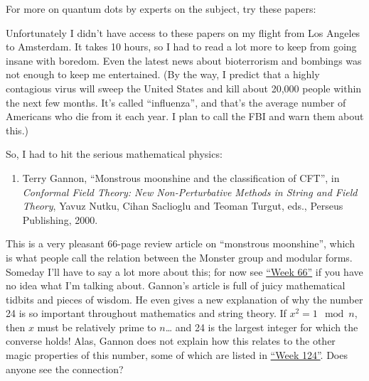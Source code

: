 \documentclass{article}
\def\tightlist{}
\renewcommand{\texttt}[1]{%
  \begingroup
  \ttfamily
  \begingroup\lccode`~=`/\lowercase{\endgroup\def~}{/\discretionary{}{}{}}%
  \begingroup\lccode`~=`[\lowercase{\endgroup\def~}{[\discretionary{}{}{}}%
  \begingroup\lccode`~=`.\lowercase{\endgroup\def~}{.\discretionary{}{}{}}%
  \catcode`/=\active\catcode`[=\active\catcode`.=\active
  \scantokens{#1\noexpand}%
  \endgroup
}
\begin{document}
For more on quantum dots by experts on the subject, try these papers:


Unfortunately I didn't have access to these papers on my flight from Los
Angeles to Amsterdam. It takes 10 hours, so I had to read a lot more to
keep from going insane with boredom. Even the latest news about
bioterrorism and bombings was not enough to keep me entertained. (By the
way, I predict that a highly contagious virus will sweep the United
States and kill about 20,000 people within the next few months. It's
called ``influenza'', and that's the average number of Americans who die
from it each year. I plan to call the FBI and warn them about this.)

So, I had to hit the serious mathematical physics:

\begin{enumerate}
\def\labelenumi{\arabic{enumi})}
\setcounter{enumi}{4}
\tightlist
\item
  Terry Gannon, ``Monstrous moonshine and the classification of CFT'',
  in \emph{Conformal Field Theory: New Non-Perturbative Methods in
  String and Field Theory}, Yavuz Nutku, Cihan Saclioglu and Teoman
  Turgut, eds., Perseus Publishing, 2000.
\end{enumerate}

This is a very pleasant 66-page review article on ``monstrous
moonshine'', which is what people call the relation between the Monster
group and modular forms. Someday I'll have to say a lot more about this;
for now see \protect\hyperlink{week66}{``Week 66''} if you have no idea
what I'm talking about. Gannon's article is full of juicy mathematical
tidbits and pieces of wisdom. He even gives a new explanation of why the
number 24 is so important throughout mathematics and string theory. If
\(x^2 = 1 \mod n\), then \(x\) must be relatively prime to \(n\)\ldots{}
and 24 is the largest integer for which the converse holds! Alas, Gannon
does not explain how this relates to the other magic properties of this
number, some of which are listed in \protect\hyperlink{week124}{``Week
124''}. Does anyone see the connection?
\end{document}
